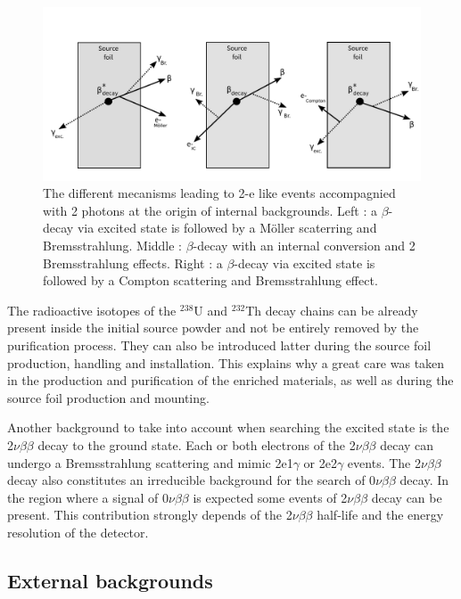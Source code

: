 \documentclass[main.tex]{subfiles}
\begin{document}
\begin{figure}[h!]
\centering
\includegraphics[scale=0.48]{pictures/Chap6/InternalBkg.pdf}
\caption{The different mecanisms leading to 2-e like events accompagnied with 2 photons at the origin of internal backgrounds. Left : a $\beta$-decay via excited state is followed by a M\"oller scaterring and Bremsstrahlung. Middle : $\beta$-decay with an internal conversion and 2 Bremsstrahlung effects. Right :  a $\beta$-decay via excited state is followed by a Compton scattering and Bremsstrahlung effect.}
\label{InternalBkgPicture}
\end{figure}


\bigskip


\NI The radioactive isotopes of the $^{\text{238}}$U and $^{\text{232}}$Th decay chains can be already present inside the initial source powder and not be entirely removed by the purification process. They can also be introduced latter during the source foil production, handling and installation. This explains why a great care was taken in the production and purification of the enriched materials, as well as during the source foil production and mounting.


\bigskip


\NI Another background to take into account when searching the excited state is the 2$\nu\beta\beta$ decay to the ground state. Each or both electrons of the 2$\nu\beta\beta$ decay can undergo a Bremsstrahlung scattering and mimic 2e1$\gamma$ or 2e2$\gamma$ events. The 2$\nu\beta\beta$ decay also constitutes an irreducible background for the search of 0$\nu\beta\beta$ decay. In the region where a signal of 0$\nu\beta\beta$ is expected some events of 2$\nu\beta\beta$ decay can be present. This contribution strongly depends of the 2$\nu\beta\beta$ half-life and the energy resolution of the detector.


\FloatBarrier


\subsection{External backgrounds}\label{sec:externalBkg}
\end{document}
